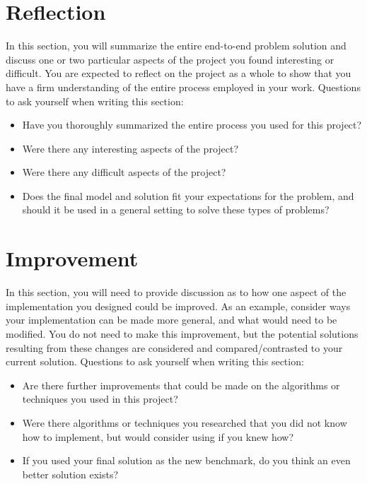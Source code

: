 \documentclass[twoside,openright,titlepage,numbers=noenddot,headinclude,%
               footinclude=true,cleardoublepage=empty,abstractoff,BCOR=5mm,%
               paper=a4,fontsize=11pt,ngerman,american]{scrreprt}
\numberwithin{theorem}{chapter}
\numberwithin{definition}{chapter}
\numberwithin{algorithm}{chapter}
\numberwithin{figure}{chapter}
\numberwithin{table}{chapter}
\numberwithin{equation}{chapter}
\begin{document}
\section*{Reflection}
In this section, you will summarize the entire end-to-end problem solution and discuss one or two particular aspects of the project you found interesting or difficult. You are expected to reflect on the project as a whole to show that you have a firm understanding of the entire process employed in your work. Questions to ask yourself when writing this section:
\begin{itemize}%
\item Have you thoroughly summarized the entire process you used for this project?
\item Were there any interesting aspects of the project?
\item Were there any difficult aspects of the project?
\item Does the final model and solution fit your expectations for the problem, and should it be used in a general setting to solve these types of problems?
\end{itemize}

\section*{Improvement}
In this section, you will need to provide discussion as to how one aspect of the implementation you designed could be improved. As an example, consider ways your implementation can be made more general, and what would need to be modified. You do not need to make this improvement, but the potential solutions resulting from these changes are considered and compared/contrasted to your current solution. Questions to ask yourself when writing this section:
\begin{itemize}%
\item Are there further improvements that could be made on the algorithms or techniques you used in this project?
\item Were there algorithms or techniques you researched that you did not know how to implement, but would consider using if you knew how?
\item If you used your final solution as the new benchmark, do you think an even better solution exists?
\end{itemize}
\end{document}
